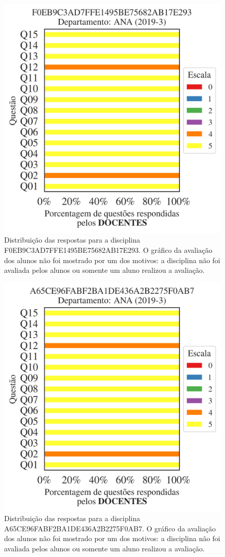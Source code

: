 \documentclass[a4paper,10pt]{article}
\begin{document}
\begin{figure}[h]
\centering
\includegraphics[width=0.485\linewidth]{analise_disciplina_departamento_ANA_F0EB9C3AD7FFE1495BE75682AB17E293_docentes.png}
\caption{\label{fig:analise_geral_departamento}                Distribuição das respostas para a disciplina F0EB9C3AD7FFE1495BE75682AB17E293. O gráfico da avaliação dos alunos não foi mostrado  por um dos motivos:  a disciplina não foi avaliada pelos alunos ou somente um aluno realizou a avaliação. }
\end{figure}
\begin{figure}[h]
\centering
\includegraphics[width=0.485\linewidth]{analise_disciplina_departamento_ANA_A65CE96FABF2BA1DE436A2B2275F0AB7_docentes.png}
\caption{\label{fig:analise_geral_departamento}                Distribuição das respostas para a disciplina A65CE96FABF2BA1DE436A2B2275F0AB7. O gráfico da avaliação dos alunos não foi mostrado  por um dos motivos:  a disciplina não foi avaliada pelos alunos ou somente um aluno realizou a avaliação. }
\end{figure}
\end{document}
